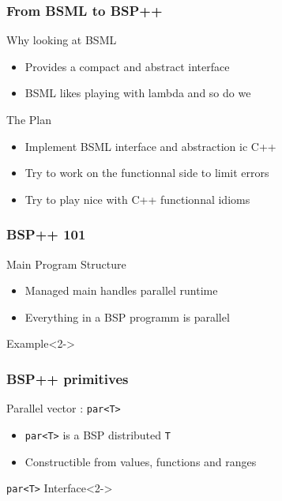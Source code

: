 \frame
{
  \frametitle{From BSML to BSP++}
  \begin{block}{Why looking at BSML}  
  \begin{itemize}
  \footnotesize
   \item Provides a compact and abstract interface
   \item BSML likes playing with lambda and so do we
  \end{itemize}
  \end{block}{}

  \begin{block}{The Plan}  
  \begin{itemize}
  \footnotesize
   \item Implement BSML interface and abstraction ic C++
   \item Try to work on the functionnal side to limit errors
   \item Try to play nice with C++ functionnal idioms
  \end{itemize}
  \end{block}{}
}


\frame
{
  \frametitle{BSP++ 101}
  \begin{block}{Main Program Structure}
  \begin{itemize}
  \footnotesize
  \item Managed main handles parallel runtime
  \item Everything in a BSP programm is parallel
  \end{itemize}
  \end{block}{}

  \begin{block}{Example}<2->
  \lstbspmain
  \end{block}{}
}

\frame
{
  \frametitle{BSP++ primitives}
  \begin{block}{Parallel vector : \texttt{par<T>}}
  \begin{itemize}
  \footnotesize
  \item \texttt{par<T>} is a BSP distributed \texttt{T}
  \item Constructible from values, functions and ranges
  \end{itemize}
  \end{block}{}

  \begin{block}{\texttt{par<T>} Interface}<2->
  \end{block}{}
}

